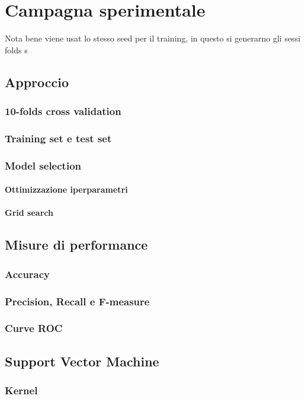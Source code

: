 \chapter{Campagna sperimentale}
Nota bene viene usat lo stesso seed per il training, in questo si generarno gli sessi folds
s
\section{Approccio}
\subsection{10-folds cross validation}

\subsection{Training set e test set}

\subsection{Model selection}
\subsubsection{Ottimizzazione iperparametri}
\subsubsection{Grid search}

\section{Misure di performance}
\subsection{Accuracy}
\subsection{Precision, Recall e F-measure}
\subsection{Curve ROC}

\section{Support Vector Machine}
\subsection{Kernel}

